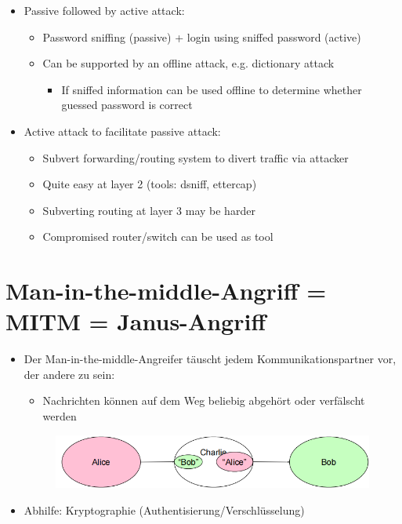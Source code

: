 \documentclass[openany]{book}
\begin{document}
\begin{itemize}
    \item Passive followed by active attack:
    \begin{itemize}
        \item Password sniffing (passive) + login using sniffed password (active)
        \item Can be supported by an offline attack, e.g. dictionary attack
        \begin{itemize}
            \item If sniffed information can be used offline to determine whether guessed password is correct
        \end{itemize}
    \end{itemize}
    \item Active attack to facilitate passive attack:
    \begin{itemize}
        \item Subvert forwarding/routing system to divert traffic via attacker
        \item Quite easy at layer 2 (tools: dsniff, ettercap)
        \item Subverting routing at layer 3 may be harder
        \item Compromised router/switch can be used as tool
    \end{itemize}
\end{itemize}

\section{Man-in-the-middle-Angriff = MITM = Janus-Angriff}

\begin{itemize}
    \item Der Man-in-the-middle-Angreifer täuscht jedem Kommunikationspartner vor, der andere zu sein:
    \begin{itemize}
        \item Nachrichten können auf dem Weg beliebig abgehört oder verfälscht werden
    \end{itemize}
    \begin{figure}[h!]
        \centering
        \includegraphics[width=0.85\linewidth]{Pics/ManInTheMiddlev2.PNG}
    \end{figure}
    \item Abhilfe: Kryptographie (Authentisierung/Verschlüsselung)
\end{itemize}
\end{document}

